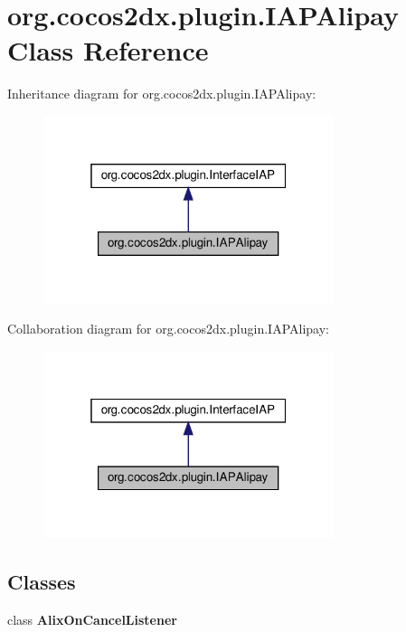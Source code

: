 \hypertarget{classorg_1_1cocos2dx_1_1plugin_1_1IAPAlipay}{}\section{org.\+cocos2dx.\+plugin.\+I\+A\+P\+Alipay Class Reference}
\label{classorg_1_1cocos2dx_1_1plugin_1_1IAPAlipay}


Inheritance diagram for org.\+cocos2dx.\+plugin.\+I\+A\+P\+Alipay\+:
\nopagebreak
\begin{figure}[H]
\begin{center}
\leavevmode
\includegraphics[width=241pt]{classorg_1_1cocos2dx_1_1plugin_1_1IAPAlipay__inherit__graph}
\end{center}
\end{figure}


Collaboration diagram for org.\+cocos2dx.\+plugin.\+I\+A\+P\+Alipay\+:
\nopagebreak
\begin{figure}[H]
\begin{center}
\leavevmode
\includegraphics[width=241pt]{classorg_1_1cocos2dx_1_1plugin_1_1IAPAlipay__coll__graph}
\end{center}
\end{figure}
\subsection*{Classes}
\begin{DoxyCompactItemize}
\item 
class {\bfseries Alix\+On\+Cancel\+Listener}
\end{DoxyCompactItemize}
